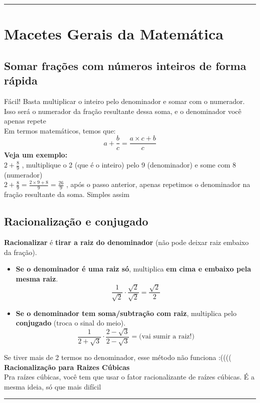 \documentclass{article}
\begin{document}
\vspace{15pt}
\hrule

\section{Macetes Gerais da Matemática}
\subsection{Somar frações com números inteiros de forma rápida}
Fácil! Basta multiplicar o inteiro pelo denominador e somar com o numerador. Isso será o numerador da fração resultante dessa soma, e o denominador você apenas repete\\[10pt]
Em termos matemáticos, temos que: 
\[
a + \frac{b}{c} = \frac{a\times c + b}{c}
\]
\textbf{Veja um exemplo:}\\[10pt]
$2 + \frac{8}{9}$ , multiplique o 2 (que é o inteiro) pelo 9 (denominador) e some com 8 (numerador)\\[10pt]
$2 + \frac{8}{9} = \frac{2 \times 9 + 8}{9} = \frac{26}{9}$ , após o passo anterior, apenas repetimos o denominador na fração resultante da soma. Simples assim

\subsection{Racionalização e conjugado}
\textbf{Racionalizar} é \textbf{tirar a raiz do denominador} (não pode deixar raiz embaixo da fração).

\begin{itemize}
  \item \textbf{Se o denominador é uma raiz só}, multiplica \textbf{em cima e embaixo pela mesma raiz}.
  \[
  \frac{1}{\sqrt{2}} \cdot \frac{\sqrt{2}}{\sqrt{2}} = \frac{\sqrt{2}}{2}
  \]

  \item \textbf{Se o denominador tem soma/subtração com raiz}, multiplica pelo \textbf{conjugado} (troca o sinal do meio).
  \[
  \frac{1}{2 + \sqrt{3}} \cdot \frac{2 - \sqrt{3}}{2 - \sqrt{3}} = \text{(vai sumir a raiz!)}
  \]
\end{itemize}
Se tiver mais de 2 termos no denominador, esse método não funciona :((((
\\[10pt]
\textbf{Racionalização para Raizes Cúbicas}
\\[5pt]
Pra raízes cúbicas, você tem que usar o fator racionalizante de raízes cúbicas. É a mesma ideia, só que mais difícil
\vspace{15pt}
\hrule
\end{document}
